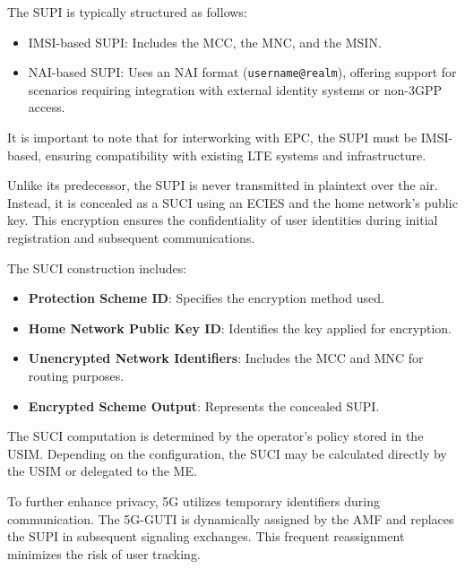 
The \ac{SUPI} is typically structured as follows:
\begin{itemize}
    \item {
        \ac{IMSI}-based \ac{SUPI}: Includes the \ac{MCC}, the \ac{MNC}, and the \ac{MSIN}.
    }
    \item {
        \ac{NAI}-based \ac{SUPI}: Uses an \ac{NAI} format (\texttt{username@realm}), offering support for scenarios requiring integration with external identity systems or non-\ac{3GPP} access.
    }
\end{itemize}

It is important to note that for interworking with \ac{EPC}, the \ac{SUPI} must be \ac{IMSI}-based, ensuring compatibility with existing \ac{LTE} systems and infrastructure.

Unlike its predecessor, the \ac{SUPI} is never transmitted in plaintext over the air. Instead, it is concealed as a \ac{SUCI} using an \ac{ECIES} and the home network’s public key. This encryption ensures the confidentiality of user identities during initial registration and subsequent communications.


The \ac{SUCI} construction includes:
\begin{itemize}
    \item{
        \textbf{Protection Scheme ID}: Specifies the encryption method used.
    }
    \item{
        \textbf{Home Network Public Key ID}: Identifies the key applied for encryption.
    }
    \item{
        \textbf{Unencrypted Network Identifiers}: Includes the \ac{MCC} and \ac{MNC} for routing purposes.
    }
    \item{
        \textbf{Encrypted Scheme Output}: Represents the concealed \ac{SUPI}.
    }
\end{itemize}

The \ac{SUCI} computation is determined by the operator's policy stored in the \ac{USIM}. Depending on the configuration, the \ac{SUCI} may be calculated directly by the \ac{USIM} or delegated to the \ac{ME}.

To further enhance privacy, \ac{5G} utilizes temporary identifiers during communication. The \acl{5G-GUTI} is dynamically assigned by the \ac{AMF} and replaces the \ac{SUPI} in subsequent signaling exchanges. This frequent reassignment minimizes the risk of user tracking.

